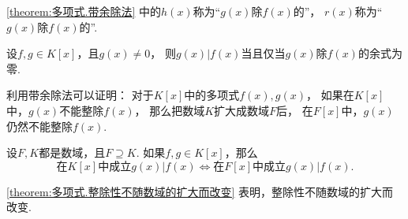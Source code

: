 \cref{theorem:多项式.带余除法} 中的\(h(x)\)称为“\(g(x)\)除\(f(x)\)的”，
\(r(x)\)称为“\(g(x)\)除\(f(x)\)的”.

\begin{corollary}
设\(f,g \in K[x]\)，且\(g(x) \neq 0\)，
则\(g(x) \vert f(x)\)当且仅当\(g(x)\)除\(f(x)\)的余式为零.
\end{corollary}

利用带余除法可以证明：
对于\(K[x]\)中的多项式\(f(x),g(x)\)，
如果在\(K[x]\)中，\(g(x)\)不能整除\(f(x)\)，
那么把数域\(K\)扩大成数域\(F\)后，
在\(F[x]\)中，\(g(x)\)仍然不能整除\(f(x)\).

\begin{proposition}\label{theorem:多项式.整除性不随数域的扩大而改变}
设\(F,K\)都是数域，且\(F \supseteq K\).
如果\(f,g \in K[x]\)，那么\[
	\text{在\(K[x]\)中成立\(g(x) \vert f(x)\)}
	\iff
	\text{在\(F[x]\)中成立\(g(x) \vert f(x)\)}.
\]
\end{proposition}

\cref{theorem:多项式.整除性不随数域的扩大而改变} 表明，整除性不随数域的扩大而改变.
